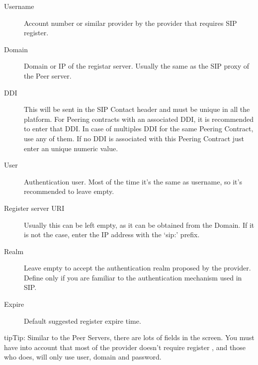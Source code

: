 \documentclass[letterpaper,10pt,english]{sphinxmanual}
\begin{document}
\begin{description}
\item[{Username}] \leavevmode{}\label{external_incoming_calls/peering_contracts:term-username}
Account number or similar provider by the provider that requires SIP
register.

\item[{Domain}] \leavevmode{}\label{external_incoming_calls/peering_contracts:term-domain}
Domain or IP of the registar server. Usually the same as the SIP proxy
of the Peer server.

\item[{DDI}] \leavevmode{}\label{external_incoming_calls/peering_contracts:term-ddi}
This will be sent in the SIP Contact header and must be unique in all
the platform. For Peering contracts with an associated DDI, it is
recommended to enter that DDI. In case of multiples DDI for the same
Peering Contract, use any of them. If no DDI is associated with this
Peering Contract just enter an unique numeric value.

\item[{User}] \leavevmode{}\label{external_incoming_calls/peering_contracts:term-user}
Authentication user. Most of the time it's the same as username, so
it's recommended to leave empty.

\item[{Register server URI}] \leavevmode{}\label{external_incoming_calls/peering_contracts:term-register-server-uri}
Usually this can be left empty, as it can be obtained from the
Domain. If it is not the case, enter the IP address with the `sip:'
prefix.

\item[{Realm}] \leavevmode{}\label{external_incoming_calls/peering_contracts:term-realm}
Leave empty to accept the authentication realm proposed by the provider.
Define only if you are familiar to the authentication mechanism used
in SIP.

\item[{Expire}] \leavevmode{}\label{external_incoming_calls/peering_contracts:term-expire}
Default suggested register expire time.

\end{description}

\begin{notice}{tip}{Tip:}
Similar to the Peer Servers, there are lots of fields in the screen.
You must have into account that most of the provider doesn't require register
, and those who does, will only use user, domain and password.
\end{notice}
\end{document}
